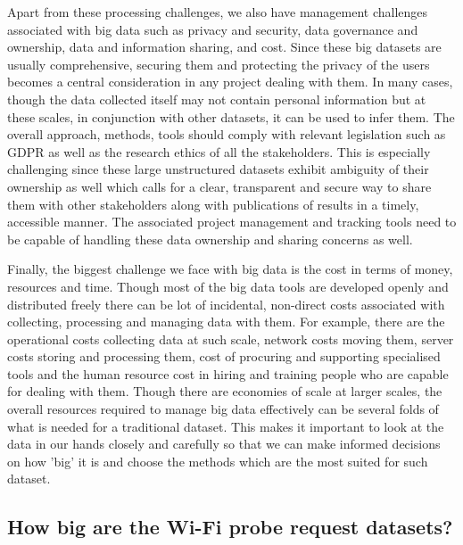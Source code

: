 Apart from these processing challenges, we also have management challenges associated with big data such as privacy and security, data governance and ownership, data and information sharing, and cost\cite{jagadish2014big}.
Since these big datasets are usually comprehensive, securing them and protecting the privacy of the users becomes a central consideration in any project dealing with them.
In many cases, though the data collected itself may not contain personal information but at these scales, in conjunction with other datasets, it can be used to infer them.
The overall approach, methods, tools should comply with relevant legislation such as GDPR as well as the research ethics of all the stakeholders.
This is especially challenging since these large unstructured datasets exhibit ambiguity of their ownership as well which calls for a clear, transparent and secure way to share them with other stakeholders along with publications of results in a timely, accessible manner.
The associated project management and tracking tools need to be capable of handling these data ownership and sharing concerns as well.

Finally, the biggest challenge we face with big data is the cost in terms of money, resources and time.
Though most of the big data tools are developed openly and distributed freely there can be lot of incidental, non-direct costs associated with collecting, processing and managing data with them.
For example, there are the operational costs collecting data at such scale, network costs moving them, server costs storing and processing them, cost of procuring and supporting specialised tools and the human resource cost in hiring and training people who are capable for dealing with them.
Though there are economies of scale at larger scales, the overall resources required to manage big data effectively can be several folds of what is needed for a traditional dataset. 
This makes it important to look at the data in our hands closely and carefully so that we can make informed decisions on how 'big' it is and choose the methods which are the most suited for such dataset.


\subsection{How big are the Wi-Fi probe request datasets?}

